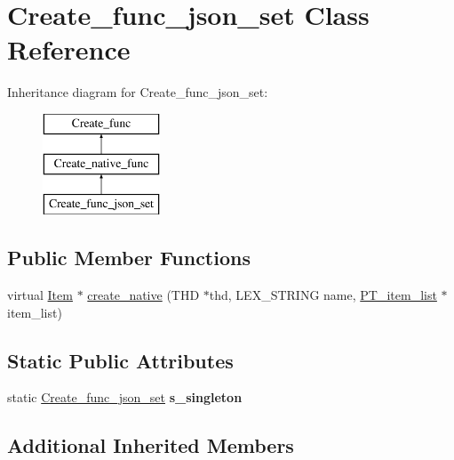 \hypertarget{classCreate__func__json__set}{}\section{Create\+\_\+func\+\_\+json\+\_\+set Class Reference}
\label{classCreate__func__json__set}
Inheritance diagram for Create\+\_\+func\+\_\+json\+\_\+set\+:\begin{figure}[H]
\begin{center}
\leavevmode
\includegraphics[height=3.000000cm]{classCreate__func__json__set}
\end{center}
\end{figure}
\subsection*{Public Member Functions}
\begin{DoxyCompactItemize}
\item 
virtual \mbox{\hyperlink{classItem}{Item}} $\ast$ \mbox{\hyperlink{classCreate__func__json__set_a5092a2329a52dccc1bbaa1c28f32b1cc}{create\+\_\+native}} (T\+HD $\ast$thd, L\+E\+X\+\_\+\+S\+T\+R\+I\+NG name, \mbox{\hyperlink{classPT__item__list}{P\+T\+\_\+item\+\_\+list}} $\ast$item\+\_\+list)
\end{DoxyCompactItemize}
\subsection*{Static Public Attributes}
\begin{DoxyCompactItemize}
\item 
\mbox{\label{classCreate__func__json__set_a31b9945fc1d617f4028006b3fac535a6}} 
static \mbox{\hyperlink{classCreate__func__json__set}{Create\+\_\+func\+\_\+json\+\_\+set}} {\bfseries s\+\_\+singleton}
\end{DoxyCompactItemize}
\subsection*{Additional Inherited Members}


